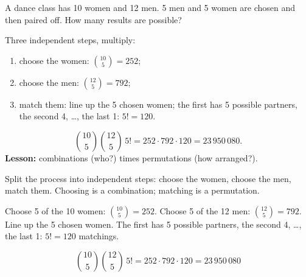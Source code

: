 
\begin{problem}
	A dance class has 10 women and 12 men. 5 men and 5 women are chosen and then
	paired off. How many results are possible?
\end{problem}

\begin{slides}
	\exstatement
	\pause
	\sol Three independent steps, multiply:
	\begin{enumerate}
		\item choose the women: $\binom{10}{5}=252$;
		\item choose the men: $\binom{12}{5}=792$;
		\item match them: line up the 5 chosen women; the first has 5 possible
		      partners, the second 4, \ldots, the last 1: $5!=120$.
	\end{enumerate}
	\[
		\binom{10}{5}\binom{12}{5}\,5! = 252\cdot 792\cdot 120 = 23\,950\,080.
	\]
	\textbf{Lesson:} combinations (who?) times permutations (how arranged?).
\end{slides}

\begin{solution}
	\idea Split the process into independent steps: choose the women, choose
	the men, match them. Choosing is a combination; matching is a permutation.

	 Choose 5 of the 10 women: $\binom{10}{5}=252$.
	 Choose 5 of the 12 men: $\binom{12}{5}=792$.
	 Line up the 5 chosen women. The first has 5 possible
	partners, the second 4, \ldots, the last 1: $5!=120$ matchings.
	\begin{answer}
		\[ \binom{10}{5}\binom{12}{5}\,5! = 252\cdot792\cdot120 =
			23\,950\,080 \]
	\end{answer}
\end{solution}
